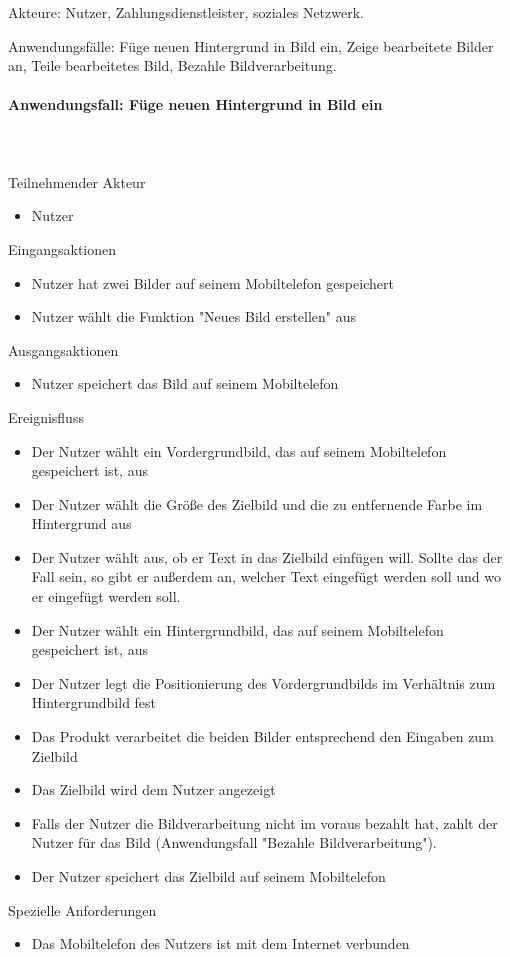 \documentclass[parskip=full]{scrartcl}
\newcommand{\paragraphashead}[1]{\paragraph{#1}\mbox{}\\\\}
\begin{document}
Akteure: Nutzer, Zahlungsdienstleister, soziales Netzwerk.

Anwendungsfälle: Füge neuen Hintergrund in Bild ein, Zeige bearbeitete Bilder an, Teile bearbeitetes Bild, Bezahle Bildverarbeitung.


\paragraphashead{Anwendungsfall: Füge neuen Hintergrund in Bild ein}
Teilnehmender Akteur
    \begin{itemize}\setlength\itemsep{-1em}
        \item Nutzer
    \end{itemize}
Eingangsaktionen
	\begin{itemize}\setlength\itemsep{-1em}
    	\item Nutzer hat zwei Bilder auf seinem Mobiltelefon gespeichert
        \item Nutzer wählt die Funktion "Neues Bild erstellen" aus
    \end{itemize}
Ausgangsaktionen
	\begin{itemize}\setlength\itemsep{-1em}
        \item Nutzer speichert das Bild auf seinem Mobiltelefon
    \end{itemize}
Ereignisfluss
	\begin{itemize}\setlength\itemsep{-1em}
        \item Der Nutzer wählt ein Vordergrundbild, das auf seinem Mobiltelefon gespeichert ist, aus
        \item Der Nutzer wählt die Größe des Zielbild und die zu entfernende Farbe im Hintergrund aus
        \item  Der Nutzer wählt aus, ob er Text in das Zielbild einfügen will. Sollte das der Fall sein, so gibt er außerdem an, welcher Text eingefügt werden soll und wo er eingefügt werden soll.
        \item Der Nutzer wählt ein Hintergrundbild, das auf seinem Mobiltelefon gespeichert ist, aus
        \item Der Nutzer legt die Positionierung des Vordergrundbilds im Verhältnis zum Hintergrundbild fest
        \item Das Produkt verarbeitet die beiden Bilder entsprechend den Eingaben zum Zielbild
        \item Das Zielbild wird dem Nutzer angezeigt
        \item Falls der Nutzer die Bildverarbeitung nicht im voraus bezahlt hat, zahlt der Nutzer für das Bild (Anwendungsfall "Bezahle Bildverarbeitung").
        \item Der Nutzer speichert das Zielbild auf seinem Mobiltelefon
    \end{itemize}
Spezielle Anforderungen
\begin{itemize}\setlength\itemsep{-1em}
  \item Das Mobiltelefon des Nutzers ist mit dem Internet verbunden
\end{itemize}
\end{document}
